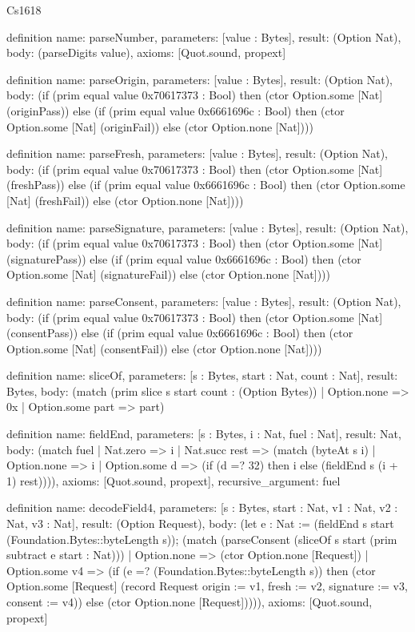 \begin{lexlean}{Cs1618}
\begin{semanticmodule}
definition{
  name: parseNumber,
  parameters: [value : Bytes],
  result: (Option Nat),
  body: (parseDigits value),
  axioms: [Quot.sound, propext]
}

definition{
  name: parseOrigin,
  parameters: [value : Bytes],
  result: (Option Nat),
  body: (if (prim equal value 0x70617373 : Bool) then (ctor Option.some [Nat] (originPass)) else (if (prim equal value 0x6661696c : Bool) then (ctor Option.some [Nat] (originFail)) else (ctor Option.none [Nat])))
}

definition{
  name: parseFresh,
  parameters: [value : Bytes],
  result: (Option Nat),
  body: (if (prim equal value 0x70617373 : Bool) then (ctor Option.some [Nat] (freshPass)) else (if (prim equal value 0x6661696c : Bool) then (ctor Option.some [Nat] (freshFail)) else (ctor Option.none [Nat])))
}

definition{
  name: parseSignature,
  parameters: [value : Bytes],
  result: (Option Nat),
  body: (if (prim equal value 0x70617373 : Bool) then (ctor Option.some [Nat] (signaturePass)) else (if (prim equal value 0x6661696c : Bool) then (ctor Option.some [Nat] (signatureFail)) else (ctor Option.none [Nat])))
}

definition{
  name: parseConsent,
  parameters: [value : Bytes],
  result: (Option Nat),
  body: (if (prim equal value 0x70617373 : Bool) then (ctor Option.some [Nat] (consentPass)) else (if (prim equal value 0x6661696c : Bool) then (ctor Option.some [Nat] (consentFail)) else (ctor Option.none [Nat])))
}

definition{
  name: sliceOf,
  parameters: [s : Bytes, start : Nat, count : Nat],
  result: Bytes,
  body: (match (prim slice s start count : (Option Bytes))
    | Option.none => 0x
    | Option.some part => part)
}

definition{
  name: fieldEnd,
  parameters: [s : Bytes, i : Nat, fuel : Nat],
  result: Nat,
  body: (match fuel
    | Nat.zero => i
    | Nat.succ rest => (match (byteAt s i)
      | Option.none => i
      | Option.some d => (if (d =? 32) then i else (fieldEnd s (i + 1) rest)))),
  axioms: [Quot.sound, propext],
  recursive_argument: fuel
}

definition{
  name: decodeField4,
  parameters: [s : Bytes, start : Nat, v1 : Nat, v2 : Nat, v3 : Nat],
  result: (Option Request),
  body: (let e : Nat := (fieldEnd s start (Foundation.Bytes::byteLength s)); (match (parseConsent (sliceOf s start (prim subtract e start : Nat)))
    | Option.none => (ctor Option.none [Request])
    | Option.some v4 => (if (e =? (Foundation.Bytes::byteLength s)) then (ctor Option.some [Request] (record Request {origin := v1, fresh := v2, signature := v3, consent := v4})) else (ctor Option.none [Request])))),
  axioms: [Quot.sound, propext]
}


\end{semanticmodule}
\end{lexlean}

